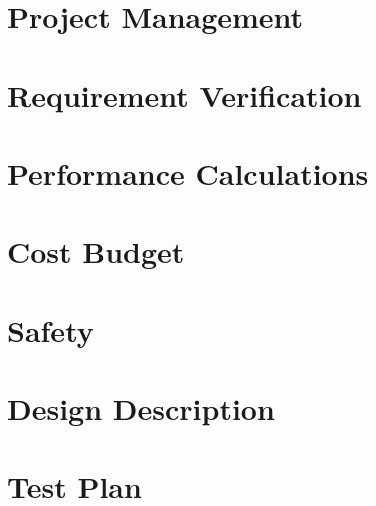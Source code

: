\documentclass[10pt, a4paper]{article}
\begin{document}
\section{Project Management} %


\section{Requirement Verification} %


\section{Performance Calculations} %


\section{Cost Budget} %


\section{Safety} %


\section{Design Description} %


\section{Test Plan} %

\end{document}
